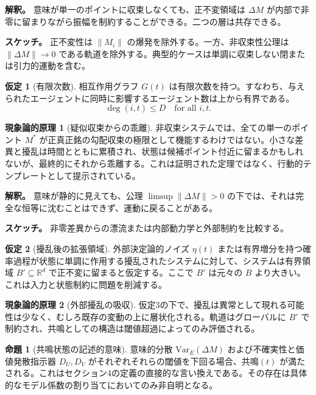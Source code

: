 \documentclass[11pt,a4paper]{article}
\theoremstyle{definition}
\newtheorem{proposition}{命題}[section]
\newtheorem{assumption}{仮定}[section]
\newtheorem{phenomenological}{現象論的原理}[section]
\begin{document}
\textbf{解釈。} 意味が単一のポイントに収束しなくても、正不変領域は $\Delta M$ が内部で非零に留まりながら振幅を制約することができる。二つの層は共存できる。

\textbf{スケッチ。} 正不変性は $\|M_i\|$ の爆発を除外する。一方、非収束性公理は $\|\Delta M\| \to 0$ である軌道を除外する。典型的ケースは単調に収束しない閉または引力的運動を含む。

\begin{assumption}[有限次数]
相互作用グラフ $G(t)$ は有限次数を持つ。すなわち、与えられたエージェントに同時に影響するエージェント数は上から有界である。
\[
\deg(i,t) \leq D \quad \text{for all } i, t.
\]
\end{assumption}

\begin{phenomenological}[疑似収束からの乖離]
非収束システムでは、全ての単一のポイント $M^*$ が正真正銘の勾配収束の極限として機能するわけではない。小さな差異と擾乱は時間とともに累積され、状態は候補ポイント付近に留まるかもしれないが、最終的にそれから乖離する。これは証明された定理ではなく、行動的テンプレートとして提示されている。

\textbf{解釈。} 意味が静的に見えても、公理 $\limsup \|\Delta M\| > 0$ の下では、それは完全な恒等に沈むことはできず、運動に戻ることがある。

\textbf{スケッチ。} 非零差異からの漂流または内部動力学と外部制約を比較する。
\end{phenomenological}

\begin{assumption}[擾乱後の拡張領域]
外部決定論的ノイズ $\eta(t)$ または有界増分を持つ確率過程が状態に単調に作用する擾乱されたシステムに対して、システムは有界領域 $B' \subseteq \mathbb{R}^d$ で正不変に留まると仮定する。ここで $B'$ は元々の $B$ より大きい。これは入力と状態制約に問題を削減する。
\end{assumption}

\begin{phenomenological}[外部擾乱の吸収]
仮定3の下で、擾乱は異常として現れる可能性は少なく、むしろ既存の変動の上に層状化される。軌道はグローバルに $B'$ で制約され、共鳴としての構造は閾値超過によってのみ評価される。
\end{phenomenological}

\begin{proposition}[共鳴状態の記述的意味]
意味的分散 $\text{Var}_E(\Delta M)$ および不確実性と価値発散指示器 $D_U, D_V$ がそれぞれそれらの閾値を下回る場合、$\text{共鳴}(t)$ が満たされる。これはセクション4の定義の直接的な言い換えである。その存在は具体的なモデル係数の割り当てにおいてのみ非自明となる。
\end{proposition}
\end{document}
